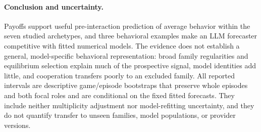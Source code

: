 \paragraph{Conclusion and uncertainty.}
Payoffs support useful pre-interaction prediction of average behavior within the seven studied archetypes, and three behavioral examples make an LLM forecaster competitive with fitted numerical models. The evidence does not establish a general, model-specific behavioral representation: broad family regularities and equilibrium selection explain much of the prospective signal, model identities add little, and cooperation transfers poorly to an excluded family. All reported intervals are descriptive game/episode bootstraps that preserve whole episodes and both focal roles and are conditional on the fixed fitted forecasts. They include neither multiplicity adjustment nor model-refitting uncertainty, and they do not quantify transfer to unseen families, model populations, or provider versions.

